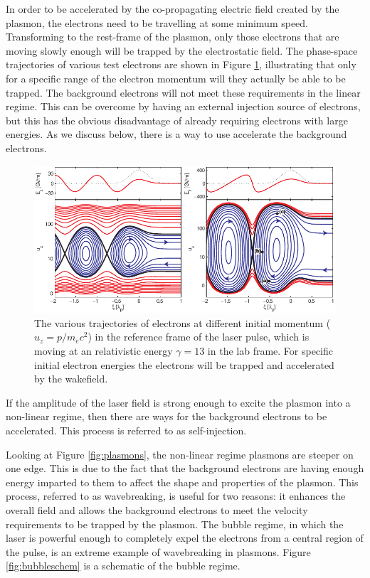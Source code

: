 \documentclass[12pt,letter]{article}
\begin{document}
    In order to be accelerated by the co-propagating electric field created by the
    plasmon, the electrons need to be travelling at some minimum speed.
    Transforming to the rest-frame of the plasmon, only those electrons that are
    moving slowly enough will be trapped by the electrostatic field.
    The phase-space trajectories of various test electrons are shown in Figure
    \ref{fig:trapping}, illustrating that only for a specific range of the
    electron momentum will they actually be able to be trapped. The background
    electrons will not meet these requirements in the linear regime. This can be
    overcome by having an external injection source of electrons, but this has
    the obvious disadvantage of already requiring electrons with large energies.
    As we discuss below, there is a way to use accelerate the background
    electrons.
\begin{figure}[h]%
    \includegraphics[width=\textwidth]{../figures/trapping.pdf}
    \caption{\label{fig:trapping} The various trajectories of electrons at
    different initial momentum ($u_z= p/m_e c^2$) in the reference frame of the laser
pulse, which is moving at an relativistic energy $\gamma = 13$ in the lab frame.
For specific initial electron energies the electrons will be trapped and
accelerated by the wakefield. }
\end{figure}


    If the amplitude of the laser field is strong enough to excite the plasmon into a non-linear regime, then there are ways for the background electrons to be
accelerated. This process is referred to as self-injection. 
    
    Looking at Figure \ref{fig:plasmons}, the
    non-linear regime plasmons are steeper on one edge. This is due to the fact
    that the background electrons are having enough energy imparted to them to
    affect the shape and properties of the plasmon. This process, referred to as
    wavebreaking, is useful for
    two reasons: it enhances the overall field and allows the background
    electrons to meet the velocity requirements to be trapped by the plasmon.
    The bubble regime, in which the laser is powerful enough to completely
    expel the electrons from a central region of the pulse, is an extreme
    example of wavebreaking in plasmons. Figure \ref{fig:bubbleschem} is a
    schematic of the bubble regime.
\end{document}
